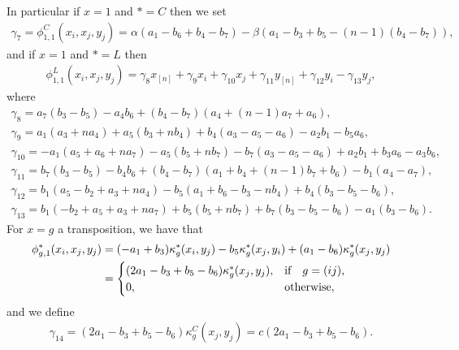 \documentclass[10pt,a4paper]{amsart}
\numberwithin{equation}{section}
\begin{document}
In particular if $x=1$ and $*=C$ then we set
\begin{gather*}
\gamma_7=\phi_{1,1}^C(x_i,x_j,y_j)=\alpha(a_1-b_6+b_4-b_7)-\beta(a_1-b_3+b_5-(n-1)(b_4-b_7)),
\end{gather*}
and if $x=1$ and $*=L$ then
\begin{gather*}
\phi_{1,1}^L(x_i,x_j,y_j)
=\gamma_8 x_{[n]} +\gamma_9 x_i +\gamma_{10} x_j +\gamma_{11} y_{[n]} +\gamma_{12} y_i -\gamma_{13}y_j,
\end{gather*}
where
\begin{gather*}
\gamma_8=a_7(b_3 - b_5) - a_4 b_6 + (b_4-b_7)(a_4 + (n-1)a_7 + a_6), \\
\gamma_9=a_1(a_3 + na_4) + a_5(b_3 + nb_4) + b_4(a_3 - a_5 - a_6) - a_2 b_1 - b_5 a_6, \\
\gamma_{10}=-a_1(a_5 + a_6 + na_7) - a_5(b_5 + nb_7) - b_7(a_3 - a_5 - a_6) + a_2 b_1 + b_3 a_6 - a_3 b_6, \\
\gamma_{11}=b_7(b_3 - b_5) - b_4 b_6 + (b_4 - b_7)(a_1 + b_4 + (n-1) b_7 + b_6) - b_1(a_4 - a_7), \\
\gamma_{12}=b_1(a_5 - b_2 + a_3 + na_4) - b_5(a_1 + b_6 - b_3 - nb_4) + b_4(b_3 - b_5 - b_6),
\\
\gamma_{13}=b_1(-b_2 + a_5 + a_3 + na_7) + b_5(b_5 + nb_7) + b_7(b_3 - b_5 - b_6) - a_1(b_3 - b_6).
\end{gather*}
For $x=g$ a transposition, we have that
\begin{align*}
\phi_{g,1}^*(x_i,x_j,y_j)&=(-a_1 + b_3)\kappa^*_g(x_i,y_j) - b_5\kappa^*_g(x_j,y_i) + (a_1 - b_6)\kappa^*_g(x_j,y_j)
\\
&=\begin{cases}
 (2a_1 - b_3 + b_5 - b_6)\kappa^*_g(x_j,y_j), & \text{if\quad $g=(ij)$,} \\
 0, & \text{otherwise},
\end{cases}
\end{align*}
and we define
\begin{gather*}
\gamma_{14}=(2a_1 - b_3 + b_5 - b_6)\kappa^C_g(x_j,y_j)=c(2a_1 - b_3 + b_5 - b_6).
\end{gather*}
\end{document}
